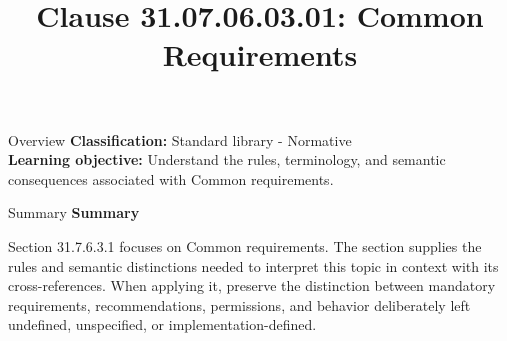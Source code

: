 \documentclass[10pt,letterpaper]{article}
\title{Clause 31.07.06.03.01: Common Requirements}
\author{}
\date{}
\begin{document}
\maketitle
\begin{CornellOverviewBox}{Overview}
\textbf{Classification:} Standard library - Normative\\[2pt]
\textbf{Learning objective:} Understand the rules, terminology, and semantic consequences associated with Common requirements.
\end{CornellOverviewBox}\begin{CornellSummaryBox}{Summary}
{\sffamily\bfseries\color{Accent} Summary}\par\vspace{3pt}Section 31.7.6.3.1 focuses on Common requirements. The section supplies the rules and semantic distinctions needed to interpret this topic in context with its cross-references. When applying it, preserve the distinction between mandatory requirements, recommendations, permissions, and behavior deliberately left undefined, unspecified, or implementation-defined.
\end{CornellSummaryBox}
\end{document}
